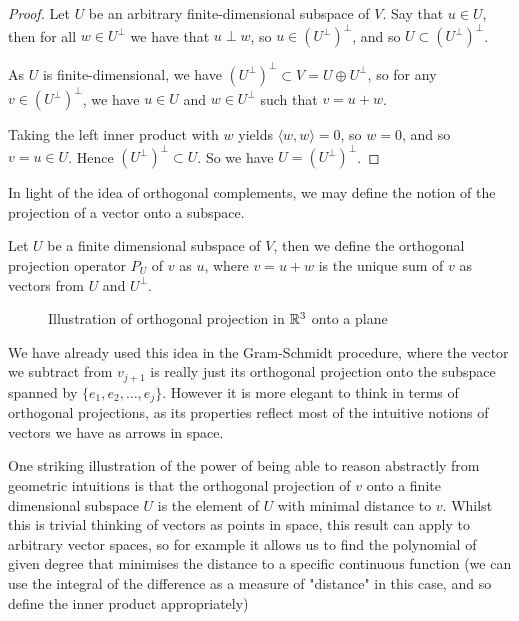 \documentclass[]{article}
\begin{document}
\begin{proof}
		Let $U$ be an arbitrary finite-dimensional subspace of $V$. Say that $u \in U$, then for all $w \in U^{\perp}$ we have that $u \perp w$, so $u \in (U^{\perp})^{\perp}$, and so $U \subset (U^{\perp})^{\perp}$. 

		As $U$ is finite-dimensional, we have $(U^{\perp})^{\perp}  \subset V = U \oplus U^{\perp}$, so  for any $v \in (U^{\perp})^{\perp}$, we have $u \in U$ and $w \in U^{\perp}$ such that $v = u + w$. 

		Taking the left inner product with $w$ yields $\langle w, w \rangle = 0$, so $w = 0$, and so $v = u \in U$. Hence $(U^{\perp})^{\perp} \subset U$. So we have $U = (U^{\perp})^{\perp}$.
\end{proof}

In light of the idea of orthogonal complements, we may define the notion of the projection of a vector onto a subspace. 

\begin{defi} 
		Let $U$ be a finite dimensional subspace of $V$, then we define the orthogonal projection operator $P_U$ of $v$ as $u$, where $v = u + w$ is the unique sum of $v$ as vectors from $U$ and $U^{\perp}$.
\end{defi}

\begin{figure}[ht]
\centering
{}
\caption{Illustration of orthogonal projection in $\mathbb{R}^{3}$ onto a plane}
\label{fig:orthogonal-projection}
\end{figure}


We have already used this idea in the Gram-Schmidt procedure, where the vector we subtract from $v_{j+1}$ is really just its orthogonal projection onto the subspace spanned by $\{e_1,e_2,\ldots,e_j\}$. However it is more elegant to think in terms of orthogonal projections, as its properties reflect most of the intuitive notions of vectors we have as arrows in space. 

One striking illustration of the power of being able to reason abstractly from geometric intuitions is that the orthogonal projection of $v$ onto a finite dimensional subspace $U$ is the element of $U$ with minimal distance to $v$. Whilst this is trivial thinking of vectors as points in space, this result can apply to arbitrary vector spaces, so for example it allows us to find the polynomial of given degree that minimises the distance to a specific continuous function (we can use the integral of the difference as a measure of "distance" in this case, and so define the inner product appropriately)
\end{document}
